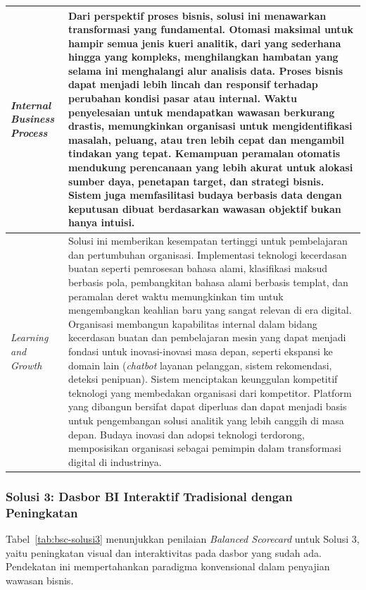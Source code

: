 \begin{longtable}{|p{3.5cm}|p{9cm}|}
\textit{Internal Business Process} & Dari perspektif proses bisnis, solusi ini menawarkan transformasi yang fundamental. Otomasi maksimal untuk hampir semua jenis kueri analitik, dari yang sederhana hingga yang kompleks, menghilangkan hambatan yang selama ini menghalangi alur analisis data. Proses bisnis dapat menjadi lebih lincah dan responsif terhadap perubahan kondisi pasar atau internal. Waktu penyelesaian untuk mendapatkan wawasan berkurang drastis, memungkinkan organisasi untuk mengidentifikasi masalah, peluang, atau tren lebih cepat dan mengambil tindakan yang tepat. Kemampuan peramalan otomatis mendukung perencanaan yang lebih akurat untuk alokasi sumber daya, penetapan target, dan strategi bisnis. Sistem juga memfasilitasi budaya berbasis data dengan keputusan dibuat berdasarkan wawasan objektif bukan hanya intuisi. \\
\hline

\textit{Learning and Growth} & Solusi ini memberikan kesempatan tertinggi untuk pembelajaran dan pertumbuhan organisasi. Implementasi teknologi kecerdasan buatan seperti pemrosesan bahasa alami, klasifikasi maksud berbasis pola, pembangkitan bahasa alami berbasis templat, dan peramalan deret waktu memungkinkan tim untuk mengembangkan keahlian baru yang sangat relevan di era digital. Organisasi membangun kapabilitas internal dalam bidang kecerdasan buatan dan pembelajaran mesin yang dapat menjadi fondasi untuk inovasi-inovasi masa depan, seperti ekspansi ke domain lain (\textit{chatbot} layanan pelanggan, sistem rekomendasi, deteksi penipuan). Sistem menciptakan keunggulan kompetitif teknologi yang membedakan organisasi dari kompetitor. Platform yang dibangun bersifat dapat diperluas dan dapat menjadi basis untuk pengembangan solusi analitik yang lebih canggih di masa depan. Budaya inovasi dan adopsi teknologi terdorong, memposisikan organisasi sebagai pemimpin dalam transformasi digital di industrinya. \\
\hline

\end{longtable}

\subsubsection{Solusi 3: Dasbor BI Interaktif Tradisional dengan Peningkatan}

Tabel~\ref{tab:bsc-solusi3} menunjukkan penilaian \textit{Balanced Scorecard} untuk Solusi 3, yaitu peningkatan visual dan interaktivitas pada dasbor yang sudah ada. Pendekatan ini mempertahankan paradigma konvensional dalam penyajian wawasan bisnis.


